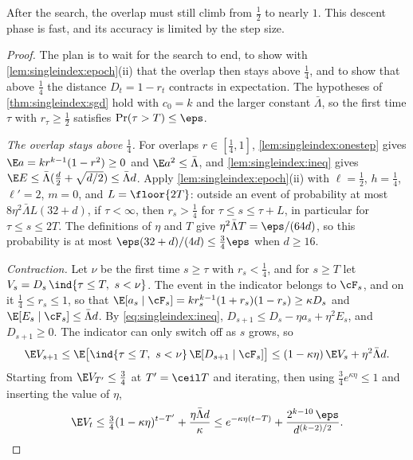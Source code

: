 \begin{refsection}
After the search, the overlap must still climb from $\frac12$ to nearly $1$. This descent phase is fast, and its accuracy is limited by the step size.


\begin{proof}
The plan is to wait for the search to end, to show with \cref{lem:singleindex:epoch}(ii) that the overlap then stays above $\frac14$, and to show that above $\frac14$ the distance $D_t=1-r_t$ contracts in expectation. The hypotheses of \cref{thm:singleindex:sgd} hold with $c_0=k$ and the larger constant $\bar\Lambda$, so the first time $\tau$ with $r_\tau\ge\frac12$ satisfies $\Pr(\tau>T)\le\eps$.

\emph{The overlap stays above $\frac14$.} For overlaps $r\in[\frac14,1]$, \cref{lem:singleindex:onestep} gives $\E a=kr^{k-1}(1-r^2)\ge0$ and $\E a^2\le\bar\Lambda$, and \cref{lem:singleindex:ineq} gives $\E E\le\bar\Lambda(\frac d2+\sqrt{d/2})\le\bar\Lambda d$. Apply \cref{lem:singleindex:epoch}(ii) with $\ell=\frac12$, $h=\frac14$, $\ell'=2$, $m=0$, and $L=\floor{2T}$: outside an event of probability at most $8\eta^2\bar\Lambda L(32+d)$, if $\tau<\infty$, then $r_s>\frac14$ for $\tau\le s\le\tau+L$, in particular for $\tau\le s\le2T$. The definitions of $\eta$ and $T$ give $\eta^2\bar\Lambda T=\eps/(64d)$, so this probability is at most $\eps(32+d)/(4d)\le\frac34\eps$ when $d\ge16$.

\emph{Contraction.} Let $\nu$ be the first time $s\ge\tau$ with $r_s<\frac14$, and for $s\ge T$ let $V_s=D_s\,\ind\{\tau\le T,\ s<\nu\}$. The event in the indicator belongs to $\cF_s$, and on it $\frac14\le r_s\le1$, so that $\E[a_s\mid\cF_s]=kr_s^{k-1}(1+r_s)(1-r_s)\ge\kappa D_s$ and $\E[E_s\mid\cF_s]\le\bar\Lambda d$. By \eqref{eq:singleindex:ineq}, $D_{s+1}\le D_s-\eta a_s+\eta^2E_s$, and $D_{s+1}\ge0$. The indicator can only switch off as $s$ grows, so
\[
  \E V_{s+1}\le\E\bigl[\ind\{\tau\le T,\ s<\nu\}\,\E[D_{s+1}\mid\cF_s]\bigr]\le(1-\kappa\eta)\,\E V_s+\eta^2\bar\Lambda d .
\]
Starting from $\E V_{T'}\le\frac34$ at $T'=\ceil T$ and iterating, then using $\frac34e^{\kappa\eta}\le1$ and inserting the value of $\eta$,
\[
  \E V_t\le\tfrac34(1-\kappa\eta)^{t-T'}+\frac{\eta\bar\Lambda d}{\kappa}\le e^{-\kappa\eta(t-T)}+\frac{2^{k-10}\,\eps}{d^{(k-2)/2}} .
\]


\end{proof}
\end{refsection}
